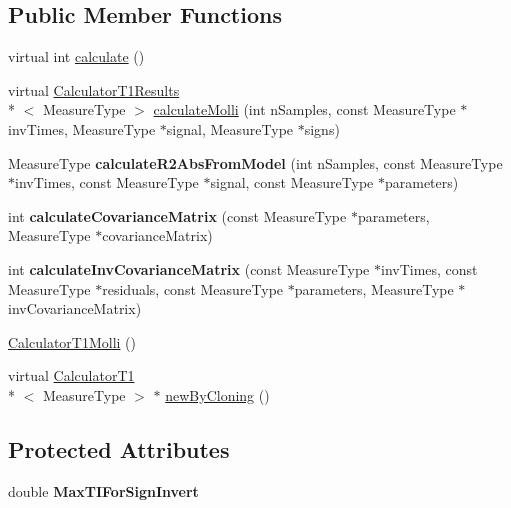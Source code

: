 \subsection*{Public Member Functions}
\begin{DoxyCompactItemize}
\item 
virtual int \hyperlink{class_ox_1_1_calculator_t1_molli_a6f15bc9c026305248c927d62748903bf}{calculate} ()
\item 
virtual \hyperlink{struct_ox_1_1_calculator_t1_results}{Calculator\-T1\-Results}\\*
$<$ Measure\-Type $>$ \hyperlink{class_ox_1_1_calculator_t1_molli_a9cb84f5e8680e1bf6c3543846fc90c4d}{calculate\-Molli} (int n\-Samples, const Measure\-Type $\ast$inv\-Times, Measure\-Type $\ast$signal, Measure\-Type $\ast$signs)
\item 
\hypertarget{class_ox_1_1_calculator_t1_molli_a9c9238dd8a96e06d3e0a96810377b90b}{Measure\-Type {\bfseries calculate\-R2\-Abs\-From\-Model} (int n\-Samples, const Measure\-Type $\ast$inv\-Times, const Measure\-Type $\ast$signal, const Measure\-Type $\ast$parameters)}\label{class_ox_1_1_calculator_t1_molli_a9c9238dd8a96e06d3e0a96810377b90b}

\item 
\hypertarget{class_ox_1_1_calculator_t1_molli_a030582bca754a7b81febfae53fe0c10c}{int {\bfseries calculate\-Covariance\-Matrix} (const Measure\-Type $\ast$parameters, Measure\-Type $\ast$covariance\-Matrix)}\label{class_ox_1_1_calculator_t1_molli_a030582bca754a7b81febfae53fe0c10c}

\item 
\hypertarget{class_ox_1_1_calculator_t1_molli_aec374fc512aa3b109138f0c16c53a171}{int {\bfseries calculate\-Inv\-Covariance\-Matrix} (const Measure\-Type $\ast$inv\-Times, const Measure\-Type $\ast$residuals, const Measure\-Type $\ast$parameters, Measure\-Type $\ast$inv\-Covariance\-Matrix)}\label{class_ox_1_1_calculator_t1_molli_aec374fc512aa3b109138f0c16c53a171}

\item 
\hyperlink{class_ox_1_1_calculator_t1_molli_ab1892de078822ea106fcaebcf81047be}{Calculator\-T1\-Molli} ()
\item 
virtual \hyperlink{class_ox_1_1_calculator_t1}{Calculator\-T1}\\*
$<$ Measure\-Type $>$ $\ast$ \hyperlink{class_ox_1_1_calculator_t1_molli_ae0fde362fbe16c4c40dee96330b4a676}{new\-By\-Cloning} ()
\end{DoxyCompactItemize}
\subsection*{Protected Attributes}
\begin{DoxyCompactItemize}
\item 
\hypertarget{class_ox_1_1_calculator_t1_molli_adb4f50cdf9dabf4890b4d28194d0522b}{double {\bfseries Max\-T\-I\-For\-Sign\-Invert}}\label{class_ox_1_1_calculator_t1_molli_adb4f50cdf9dabf4890b4d28194d0522b}

\end{DoxyCompactItemize}
